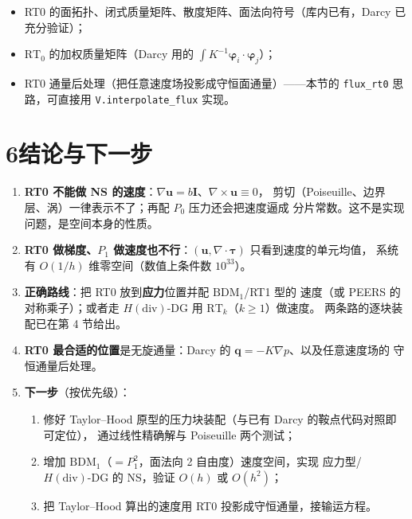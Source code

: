 \documentclass[UTF8,11pt,a4paper]{ctexart}
\theoremstyle{wjplain}
\theoremstyle{wjdef}
\newcommand{\bu}{\boldsymbol u}
\newcommand{\bq}{\boldsymbol q}
\newcommand{\bI}{\boldsymbol I}
\newcommand{\bvarphi}{\boldsymbol\varphi}
\newcommand{\bT}{\boldsymbol\tau}
\newcommand{\grad}{\nabla}
\newcommand{\dive}{\nabla\cdot}
\newcommand{\curl}{\nabla\times}
\newcommand{\RT}{\mathrm{RT}}
\begin{document}
\begin{itemize}
  \item RT0 的面拓扑、闭式质量矩阵、散度矩阵、面法向符号（库内已有，Darcy 已充分验证）；
  \item $\RT_0$ 的加权质量矩阵（Darcy 用的 $\int K^{-1}\bvarphi_i\cdot\bvarphi_j$）；
  \item RT0 通量后处理（把任意速度场投影成守恒面通量）——本节的
        \texttt{flux\_rt0} 思路，可直接用 \texttt{V.interpolate\_flux} 实现。
\end{itemize}

\section{\texorpdfstring{6\quad 结论与下一步}{6 结论与下一步}}

\begin{enumerate}
  \item \textbf{RT0 不能做 NS 的速度}：$\grad\bu=b\bI$、$\curl\bu\equiv0$，
        剪切（Poiseuille、边界层、涡）一律表示不了；再配 $P_0$ 压力还会把速度逼成
        分片常数。这不是实现问题，是空间本身的性质。
  \item \textbf{RT0 做梯度、$P_1$ 做速度也不行}：$(\bu,\dive\bT)$ 只看到速度的单元均值，
        系统有 $O(1/h)$ 维零空间（数值上条件数 $10^{33}$）。
  \item \textbf{正确路线}：把 RT0 放到\textbf{应力}位置并配 $\mathrm{BDM}_1$/RT1 型的
        速度（或 PEERS 的对称乘子）；或者走 $H(\mathrm{div})$-DG 用 $\RT_k$（$k\ge1$）做速度。
        两条路的逐块装配已在第 4 节给出。
  \item \textbf{RT0 最合适的位置}是无旋通量：Darcy 的 $\bq=-K\grad p$、以及任意速度场的
        守恒通量后处理。
  \item \textbf{下一步}（按优先级）：
        \begin{enumerate}
          \item 修好 Taylor--Hood 原型的压力块装配（与已有 Darcy 的鞍点代码对照即可定位），
                通过线性精确解与 Poiseuille 两个测试；
          \item 增加 $\mathrm{BDM}_1$（$=P_1^2$，面法向 2 自由度）速度空间，实现
                应力型/ $H(\mathrm{div})$-DG 的 NS，验证 $O(h)$ 或 $O(h^2)$；
          \item 把 Taylor--Hood 算出的速度用 RT0 投影成守恒通量，接输运方程。
        \end{enumerate}
\end{enumerate}
\end{document}
